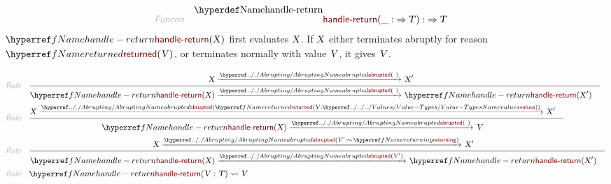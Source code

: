 \begin{align*}
  \KEY{Funcon} \quad
  & \NAMEDECL{handle-return}(
                       \_ :  \TO \VAR{T}) 
    :  \TO \VAR{T} 
\end{align*}
$\SHADE{\NAMEREF{handle-return}
           (  \VAR{X} )}$ first evaluates $\SHADE{\VAR{X}}$. If $\SHADE{\VAR{X}}$ either terminates abruptly for 
  reason $\SHADE{\NAMEREF{returned}
           (  \VAR{V} )}$, or terminates normally with value $\SHADE{\VAR{V}}$, it gives $\SHADE{\VAR{V}}$.

\begin{align*}
  \KEY{Rule} \quad
    & \RULE{
      &  \VAR{X} \xrightarrow{\NAMEHYPER{../.}{Abrupting}{abrupted}(   \  )}_{} 
          \VAR{X}'
      }{
      &  \NAMEREF{handle-return}
                      (  \VAR{X} ) \xrightarrow{\NAMEHYPER{../.}{Abrupting}{abrupted}(   \  )}_{} 
          \NAMEREF{handle-return}
            (  \VAR{X}' )
      }
\\
  \KEY{Rule} \quad
    & \RULE{
      &  \VAR{X} \xrightarrow{\NAMEHYPER{../.}{Abrupting}{abrupted}(  \NAMEREF{returned}
                                                                                  (  \VAR{V} : \NAMEHYPER{../../../Values}{Value-Types}{values} ) )}_{} 
          \VAR{X}'
      }{
      &  \NAMEREF{handle-return}
                      (  \VAR{X} ) \xrightarrow{\NAMEHYPER{../.}{Abrupting}{abrupted}(   \  )}_{} 
          \VAR{V}
      }
\\
  \KEY{Rule} \quad
    & \RULE{
      &  \VAR{X} \xrightarrow{\NAMEHYPER{../.}{Abrupting}{abrupted}(  \VAR{V}' : \mathop{\sim} \NAMEREF{returning} )}_{} 
          \VAR{X}'
      }{
      &  \NAMEREF{handle-return}
                      (  \VAR{X} ) \xrightarrow{\NAMEHYPER{../.}{Abrupting}{abrupted}(  \VAR{V}' )}_{} 
          \NAMEREF{handle-return}
            (  \VAR{X}' )
      }
\\
  \KEY{Rule} \quad
    & \NAMEREF{handle-return}
        (  \VAR{V} : \VAR{T} ) \leadsto 
        \VAR{V}
\end{align*}


